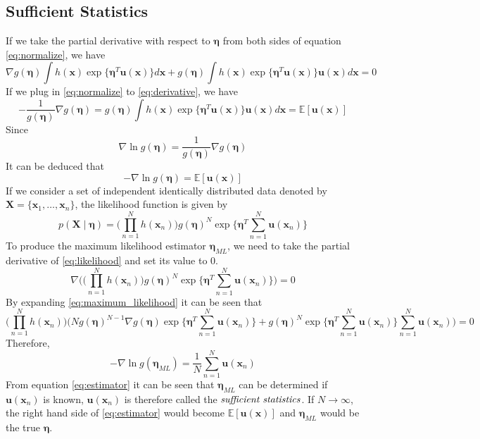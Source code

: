 \documentclass[12pt]{article}
\begin{document}
\subsection{Sufficient Statistics}
If we take the partial derivative with respect to $\bm{\eta}$ from both sides of equation \ref{eq:normalize}, we have
\begin{equation}\label{eq:derivative}
\nabla g(\bm{\eta})\int{h(\textbf{x})\exp\{\bm{\eta}^T\textbf{u}(\textbf{x})\}}d\textbf{x} + g(\bm{\eta})\int{h(\textbf{x})\exp\{\bm{\eta}^T\textbf{u}(\textbf{x})\}}\textbf{u}(\textbf{x})d\textbf{x}=0
\end{equation}
If we plug in \ref{eq:normalize} to \ref{eq:derivative}, we have
\begin{equation}
    -\frac{1}{g(\bm{\eta})}\nabla g(\bm{\eta})=g(\bm{\eta})\int{h(\textbf{x})\exp\{\bm{\eta}^T\textbf{u}(\textbf{x})\}}\textbf{u}(\textbf{x})d\textbf{x}=\mathbb{E}[\textbf{u}(\textbf{x})]
\end{equation}
Since
\begin{displaymath}
\nabla \ln{g(\bm{\eta})} = \frac{1}{g(\bm{\eta})}\nabla g(\bm{\eta})
\end{displaymath}
It can be deduced that
\begin{equation}
    -\nabla \ln{g(\bm{\eta})} = \mathbb{E}[\textbf{u}(\textbf{x})]
\end{equation}
If we consider a set of independent identically distributed data denoted by $\textbf{X}=\{\textbf{x}_1,\dots,\textbf{x}_n\}$, the likelihood function is given by
\begin{equation}\label{eq:likelihood}
    p(\textbf{X}\mid\bm{\eta})=\Big(\prod_{n=1}^{N}h(\textbf{x}_n)\Big)g(\bm{\eta})^N\exp\Big\{\bm{\eta}^T\sum_{n=1}^N\textbf{u}(\textbf{x}_n)\Big\}
\end{equation}
To produce the maximum likelihood estimator $\bm{\eta}_{ML}$, we need to take the partial derivative of \ref{eq:likelihood} and set its value to 0.
\begin{equation}\label{eq:maximum_likelihood}
    \nabla \bigg(\Big(\prod_{n=1}^{N}h(\textbf{x}_n)\Big)g(\bm{\eta})^N\exp\Big\{\bm{\eta}^T\sum_{n=1}^N\textbf{u}(\textbf{x}_n)\Big\}\bigg) =0
\end{equation}
By expanding \ref{eq:maximum_likelihood} it can be seen that 
\begin{displaymath}
\Big(\prod_{n=1}^{N}h(\textbf{x}_n)\Big)\Big(Ng(\bm{\eta})^{N-1}\nabla g(\bm{\eta})\exp\Big\{\bm{\eta}^T\sum_{n=1}^N\textbf{u}(\textbf{x}_n)\Big\}+g(\bm{\eta})^N \exp\{\bm{\eta}^T\sum_{n=1}^N\textbf{u}(\textbf{x}_n)\}\sum_{n=1}^N\textbf{u}(\textbf{x}_n)\Big)=0
\end{displaymath}
Therefore,
\begin{equation}\label{eq:estimator}
    -\nabla \ln{g(\bm{\eta}_{ML})} = \frac{1}{N}\sum_{n=1}^N\textbf{u}(\textbf{x}_n)
\end{equation}
From equation \ref{eq:estimator} it can be seen that $\bm{\eta}_{ML}$ can be determined if $\textbf{u}(\textbf{x}_n)$ is known, $\textbf{u}(\textbf{x}_n)$ is therefore called the $\emph{sufficient statistics}$. If $N\rightarrow \infty$, the right hand side of \ref{eq:estimator} would become $\mathbb{E}[\textbf{u}(\textbf{x})]$ and $\bm{\eta}_{ML}$ would be the true $\bm{\eta}$.
\end{document}
